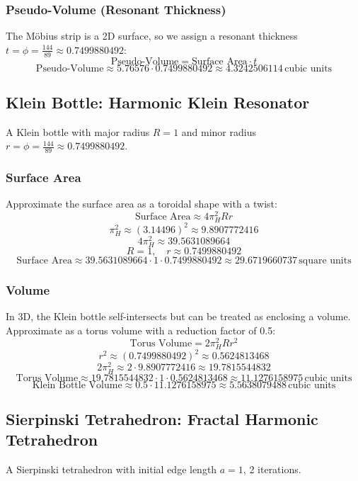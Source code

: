\subsubsection{Pseudo-Volume (Resonant Thickness)}
The Möbius strip is a 2D surface, so we assign a resonant thickness \( t = \phi = \frac{144}{89} \approx 0.7499880492 \):
\[
\text{Pseudo-Volume} = \text{Surface Area} \cdot t
\]
\[
\text{Pseudo-Volume} \approx 5.76576 \cdot 0.7499880492 \approx 4.3242506114 \, \text{cubic units}
\]

\subsection{Klein Bottle: Harmonic Klein Resonator}
A Klein bottle with major radius \( R = 1 \) and minor radius \( r = \phi = \frac{144}{89} \approx 0.7499880492 \).

\subsubsection{Surface Area}
Approximate the surface area as a toroidal shape with a twist:
\[
\text{Surface Area} \approx 4 \pi_H^2 R r
\]
\[
\pi_H^2 \approx (3.14496)^2 \approx 9.8907772416
\]
\[
4 \pi_H^2 \approx 39.5631089664
\]
\[
R = 1, \quad r \approx 0.7499880492
\]
\[
\text{Surface Area} \approx 39.5631089664 \cdot 1 \cdot 0.7499880492 \approx 29.6719660737 \, \text{square units}
\]

\subsubsection{Volume}
In 3D, the Klein bottle self-intersects but can be treated as enclosing a volume. Approximate as a torus volume with a reduction factor of 0.5:
\[
\text{Torus Volume} = 2 \pi_H^2 R r^2
\]
\[
r^2 \approx (0.7499880492)^2 \approx 0.5624813468
\]
\[
2 \pi_H^2 \approx 2 \cdot 9.8907772416 \approx 19.7815544832
\]
\[
\text{Torus Volume} \approx 19.7815544832 \cdot 1 \cdot 0.5624813468 \approx 11.1276158975 \, \text{cubic units}
\]
\[
\text{Klein Bottle Volume} \approx 0.5 \cdot 11.1276158975 \approx 5.5638079488 \, \text{cubic units}
\]

\subsection{Sierpinski Tetrahedron: Fractal Harmonic Tetrahedron}
A Sierpinski tetrahedron with initial edge length \( a = 1 \), 2 iterations.


